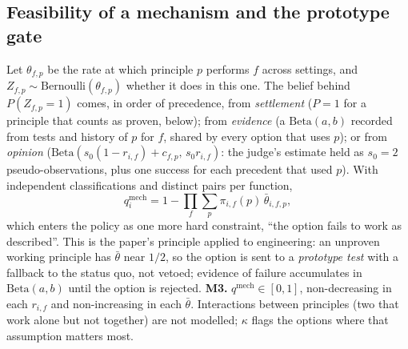 \documentclass[11pt]{article}
\theoremstyle{definition}
\begin{document}
\subsection{Feasibility of a mechanism and the prototype gate}

Let $\theta_{f,p}$ be the rate at which principle $p$ performs $f$ across settings, and
$Z_{f,p}\sim\mathrm{Bernoulli}(\theta_{f,p})$ whether it does in this one. The belief behind
$P(Z_{f,p}=1)$ comes, in order of precedence, from \emph{settlement} ($P=1$ for a principle that
counts as proven, below); from \emph{evidence} (a $\mathrm{Beta}(a,b)$ recorded from tests and
history of $p$ for $f$, shared by every option that uses $p$); or from \emph{opinion}
($\mathrm{Beta}(s_0(1-r_{i,f})+c_{f,p},\,s_0r_{i,f})$: the judge's estimate held as $s_0=2$
pseudo-observations, plus one success for each precedent that used $p$). With independent
classifications and distinct pairs per function,
\begin{equation}\label{eq:qmech}
q_i^{\mathrm{mech}}=1-\prod_f\sum_p\pi_{i,f}(p)\,\bar\theta_{i,f,p},
\end{equation}
which enters the policy as one more hard constraint, ``the option fails to work as described''.
This is the paper's principle applied to engineering: an unproven working principle has
$\bar\theta$ near $1/2$, so the option is sent to a \emph{prototype test} with a fallback to the
status quo, not vetoed; evidence of failure accumulates in $\mathrm{Beta}(a,b)$ until the option is
rejected. \textbf{M3.} $q^{\mathrm{mech}}\in[0,1]$, non-decreasing in each $r_{i,f}$ and
non-increasing in each $\bar\theta$. Interactions between principles (two that work alone but not
together) are not modelled; $\kappa$ flags the options where that assumption matters most.
\end{document}
